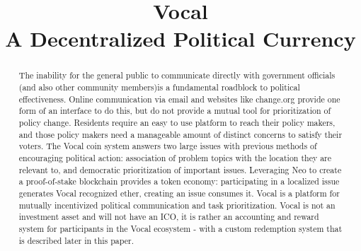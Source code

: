 \documentclass[conference]{IEEEtran}
\begin{document}
    \title{Vocal\\ A Decentralized Political Currency }
    
    \author{
        \and
    }

    \maketitle
    
    \begin{abstract}
      The inability for the general public to communicate directly with government officials (and also other community members)is a fundamental roadblock to political effectiveness. Online communication via email and websites like change.org provide one form of an interface to do this, but do not provide a mutual tool for prioritization of policy change. Residents require an easy to use platform to reach their policy makers, and those policy makers need a manageable amount of distinct concerns to satisfy their voters. The Vocal coin system answers two large issues with previous methods of encouraging political action: association of problem topics with the location they are relevant to, and democratic prioritization of important issues. Leveraging Neo to create a proof-of-stake blockchain provides a token economy: participating in a localized issue generates Vocal recognized ether, creating an issue consumes it. Vocal is a platform for mutually incentivized political communication and task prioritization. Vocal is not an investment asset and will not have an ICO, it is rather an accounting and reward system for participants in the Vocal ecosystem - with a custom redemption system that is described later in this paper.
    

    \end{abstract}
\end{document}
